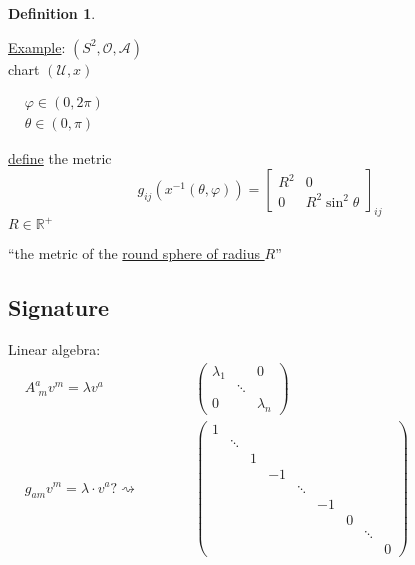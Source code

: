 \documentclass[10pt]{amsart}
\newtheorem{definition}{Definition}
\begin{document}
\begin{multicols*}{2}
\begin{definition}
		
	\end{definition}
	
	\underline{Example}: $(S^2, \mathcal{O}, \mathcal{A})$ \\ 
	\phantom{example } chart $(\mathcal{U}, x)$
	
	$\begin{aligned} 
	& \varphi \in (0,2\pi ) \\ 
	& \theta \in (0,\pi)\end{aligned}$
	
	\underline{define} the metric
	\[
	g_{ij}(x^{-1}(\theta,\varphi)) = \left[ \begin{matrix} R^2 & 0 \\
	0 & R^2\sin^2{\theta} \end{matrix} \right]_{ij}
	\]
	$R \in \mathbb{R}^+$
	
	``the metric of the \underline{round sphere of radius $R$}''
	
	\subsection{Signature} 
	
	Linear algebra: \quad \quad \, $ \begin{aligned} & A^a_{\,\,m}v^m = \lambda v^a & \quad \quad \quad \, \left( \begin{matrix} \lambda_1 & & 0 \\
	& \ddots & \\ 
	0 & & \lambda_n \end{matrix} \right) \\
	& g_{am} v^m = \lambda \cdot v^a ? \rightsquigarrow  & \quad \quad \quad \, \left( \begin{matrix} 
	1        &   &    &        &    &   &        & \\
	& \ddots &   &    &        &    &   &        & \\
	&        & 1 &    &        &    &   &        & \\
	&        &   & -1 &        &    &   &        & \\
	&        &   &    & \ddots &    &   &        & \\
	&        &   &    &        & -1 &   &        & \\
	&        &   &    &        &    & 0 &        & \\
	&        &   &    &        &    &   & \ddots & \\
	&        &   &    &        &    &   &        & 0 \end{matrix} \right)
	\end{aligned}$
	

\end{multicols*}
\end{document}
